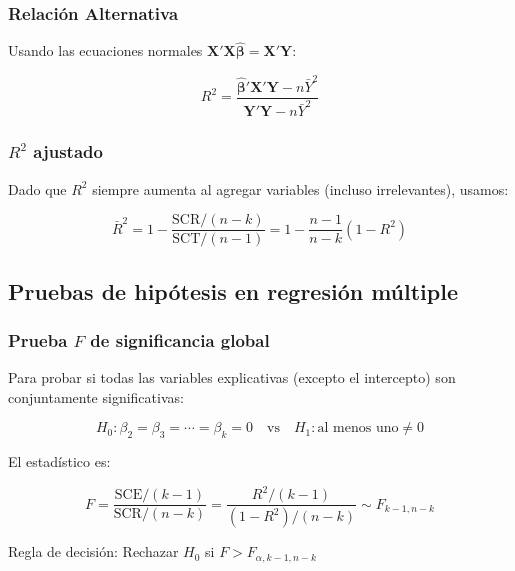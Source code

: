 \documentclass[11pt,a4paper]{article}
\begin{document}
\subsubsection*{Relación Alternativa}
 
Usando las ecuaciones normales $\mathbf{X}'\mathbf{X}\hat{\boldsymbol{\beta}} = \mathbf{X}'\mathbf{Y}$:
 
\[
R^2 = \frac{\hat{\boldsymbol{\beta}}'\mathbf{X}'\mathbf{Y} - n\bar{Y}^2}{\mathbf{Y}'\mathbf{Y} - n\bar{Y}^2}
\]
 
\subsubsection*{\(R^2\) ajustado}
 
\begin{teorema}
 
Dado que $R^2$ siempre aumenta al agregar variables (incluso irrelevantes), usamos:
 
\begin{resultado}
\[
\boxed{\bar{R}^2 = 1 - \frac{\text{SCR}/(n-k)}{\text{SCT}/(n-1)} = 1 - \frac{n-1}{n-k}(1-R^2)}
\]
\end{resultado}
 
\end{teorema}
 
 
\subsection{Pruebas de hipótesis en regresión múltiple}
 
\subsubsection*{Prueba \(F\) de significancia global}
 
\begin{teorema}
 
Para probar si todas las variables explicativas (excepto el intercepto) son conjuntamente significativas:
 
\[
H_0: \beta_2 = \beta_3 = \cdots = \beta_k = 0 \quad \text{vs} \quad H_1: \text{al menos uno} \neq 0
\]
 
El estadístico es:
 
\begin{resultado}
\[
\boxed{F = \frac{\text{SCE}/(k-1)}{\text{SCR}/(n-k)} = \frac{R^2/(k-1)}{(1-R^2)/(n-k)} \sim F_{k-1, n-k}}
\]
\end{resultado}
 
Regla de decisión: Rechazar $H_0$ si $F > F_{\alpha, k-1, n-k}$
 
\end{teorema}
 
\end{document}
